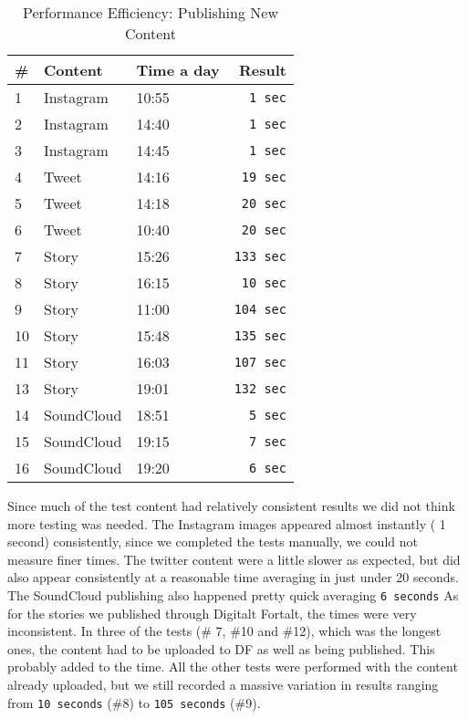 \begin{table}[!htp]
\begin{center}
	\begin{tabular}{ | l | l | l | r | }
	\hline
	 \#	 	& Content 		& Time a day 		& Result \\ \hline
	 1		&Instagram		& 10:55			& \texttt{1 sec} \\ \hline
	 2		&Instagram		& 14:40			& \texttt{1 sec} \\ \hline
	 3		&Instagram		& 14:45			& \texttt{1 sec} \\ \hline
	 4		&Tweet		& 14:16			& \texttt{19 sec} \\ \hline
	 5		&Tweet		& 14:18			& \texttt{20 sec} \\ \hline
	 6		&Tweet		& 10:40			& \texttt{20 sec} \\ \hline
	 7		&Story		& 15:26			& \texttt{133 sec}\\ \hline
	 8		&Story		& 16:15			& \texttt{10 sec}\\ \hline
	 9		&Story 		& 11:00			& \texttt{104 sec}\\ \hline
	 10		&Story		& 15:48			& \texttt{135 sec}\\ \hline
	 11		&Story		& 16:03			& \texttt{107 sec}\\ \hline
	 13		&Story		& 19:01			& \texttt{132 sec}\\ \hline
	 14		&SoundCloud		& 18:51			& \texttt{5 sec}\\ \hline
	 15		&SoundCloud		& 19:15			& \texttt{7 sec}\\ \hline
	 16		&SoundCloud		& 19:20			& \texttt{6 sec}\\  
	 \hline
 	 \end{tabular}
\end{center}
\caption{Performance Efficiency: Publishing New Content}
\label{tab:Performance Efficiency: Publishing New Content}
\end{table}

Since much of the test content had relatively consistent results we did not think more testing was needed. The Instagram images appeared almost instantly ( 1 second) consistently, since we completed the tests manually, we could not measure finer times. The twitter content were a little slower as expected, but did also appear consistently at a reasonable time averaging in just under 20 seconds. The SoundCloud publishing also happened pretty quick averaging \texttt{6 seconds} As for the stories we published through Digitalt Fortalt, the times were very inconsistent. In three of the tests (\# 7, \#10 and \#12), which was the longest ones, the content had to be uploaded to DF as well as being published. This probably added to the time. All the other tests were performed with the content already uploaded, but we still recorded a massive variation in results ranging from \texttt{10 seconds} (\#8) to \texttt{105 seconds} (\#9).


